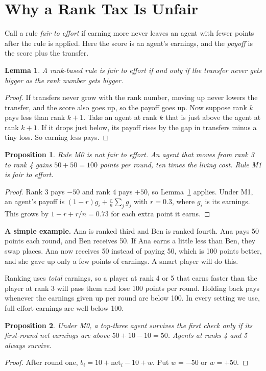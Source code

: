 \documentclass[conference]{IEEEtran}
\theoremstyle{plain}
\newtheorem{lemma}{Lemma}
\newtheorem{proposition}{Proposition}
\begin{document}
\section{Why a Rank Tax Is Unfair}
\label{sec:theory}
Call a rule \emph{fair to effort} if earning more never leaves an agent with fewer points after the rule is applied. Here the score is an agent's earnings, and the \emph{payoff} is the score plus the transfer.

\begin{lemma}\label{lem:fair}
A rank-based rule is fair to effort if and only if the transfer never gets bigger as the rank number gets bigger.
\end{lemma}
\begin{proof}
If transfers never grow with the rank number, moving up never lowers the transfer, and the score also goes up, so the payoff goes up. Now suppose rank $k$ pays less than rank $k+1$. Take an agent at rank $k$ that is just above the agent at rank $k+1$. If it drops just below, its payoff rises by the gap in transfers minus a tiny loss. So earning less pays.
\end{proof}

\begin{proposition}\label{prop:sandbag}
Rule M0 is not fair to effort. An agent that moves from rank 3 to rank 4 gains $50+50=100$ points per round, ten times the living cost. Rule M1 is fair to effort.
\end{proposition}
\begin{proof}
Rank 3 pays $-50$ and rank 4 pays $+50$, so Lemma~\ref{lem:fair} applies. Under M1, an agent's payoff is $(1-r)g_i+\tfrac{r}{n}\sum_j g_j$ with $r=0.3$, where $g_i$ is its earnings. This grows by $1-r+r/n=0.73$ for each extra point it earns.
\end{proof}

\textbf{A simple example.} Ana is ranked third and Ben is ranked fourth. Ana pays 50 points each round, and Ben receives 50. If Ana earns a little less than Ben, they swap places. Ana now receives 50 instead of paying 50, which is 100 points better, and she gave up only a few points of earnings. A smart player will do this.

Ranking uses \emph{total} earnings, so a player at rank 4 or 5 that earns faster than the player at rank 3 will pass them and lose 100 points per round. Holding back pays whenever the earnings given up per round are below 100. In every setting we use, full-effort earnings are well below 100.

\begin{proposition}\label{prop:first}
Under M0, a top-three agent survives the first check only if its first-round net earnings are above $50+10-10=50$. Agents at ranks 4 and 5 always survive.
\end{proposition}
\begin{proof}
After round one, $b_i=10+\text{net}_i-10+w$. Put $w=-50$ or $w=+50$.
\end{proof}
\end{document}

